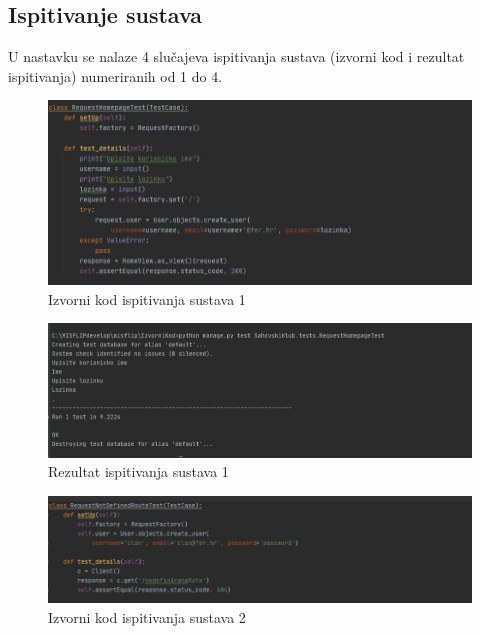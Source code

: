 			
			\subsection{Ispitivanje sustava}
			
			U nastavku se nalaze 4 slučajeva ispitivanja sustava (izvorni kod i rezultat ispitivanja) numeriranih od 1 do 4.
			
			 	\begin{figure}[H]
			 	\centerfloat
			 	\includegraphics[scale=0.55]{slike/ispitivanjesustava1izv.jpeg} %
			 	\caption{Izvorni kod ispitivanja sustava 1}
			 	
			 \end{figure}
			 
			 \begin{figure}[H]
			 	\centerfloat
			 	\includegraphics[scale=0.55]{slike/ispitivanjesustava1.jpeg} %
			 	\caption{Rezultat ispitivanja sustava 1}
			 	
			 \end{figure}
			 
			 \begin{figure}[H]
			 	\centerfloat
			 	\includegraphics[scale=0.55]{slike/ispitivanjesustava2izv.jpeg} %
			 	\caption{Izvorni kod ispitivanja sustava 2}
			 	
			 \end{figure}
			 
